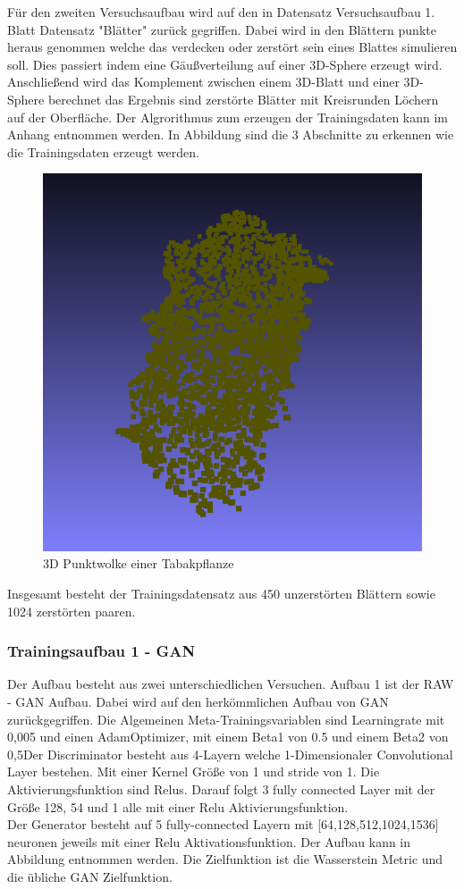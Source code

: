 \documentclass{llncs}
\begin{document}
Für den zweiten Versuchsaufbau wird auf den in Datensatz Versuchsaufbau 1. Blatt Datensatz "Blätter" zurück gegriffen. Dabei wird in den Blättern punkte heraus genommen welche das verdecken oder zerstört sein eines Blattes simulieren soll. Dies passiert indem eine Gäußverteilung auf einer 3D-Sphere erzeugt wird. Anschließend wird das Komplement zwischen einem 3D-Blatt und einer 3D-Sphere berechnet das Ergebnis sind zerstörte Blätter mit Kreisrunden Löchern auf der Oberfläche. Der Algrorithmus zum erzeugen der Trainingsdaten kann im Anhang entnommen werden. In Abbildung sind die 3 Abschnitte zu erkennen wie die Trainingsdaten erzeugt werden. 
\begin{figure}[htbp] 
	\centering
	\includegraphics[width=1.2\textwidth]{leaf1.png}
	\caption{3D Punktwolke einer Tabakpflanze}
	\label{fig:Bild2}
\end{figure}

Insgesamt besteht der Trainingsdatensatz aus 450 unzerstörten Blättern sowie 1024 zerstörten paaren. 
\subsubsection{Trainingsaufbau 1 - GAN}
Der Aufbau besteht aus zwei unterschiedlichen Versuchen. Aufbau 1 ist der RAW - GAN Aufbau. Dabei wird auf den herkömmlichen Aufbau von GAN zurückgegriffen. Die Algemeinen Meta-Trainingsvariablen sind Learningrate mit 0,005 und einen AdamOptimizer, mit einem Beta1 von 0.5 und einem Beta2 von 0,5Der Discriminator besteht aus 4-Layern welche 1-Dimensionaler Convolutional Layer bestehen. Mit einer Kernel Größe von 1 und stride von 1. Die Aktivierungsfunktion sind Relus. Darauf folgt 3 fully connected Layer mit der Größe 128, 54 und 1 alle mit einer Relu Aktivierungsfunktion.
\\
Der Generator besteht auf 5 fully-connected Layern mit [64,128,512,1024,1536] neuronen jeweils mit einer Relu Aktivationsfunktion. Der Aufbau kann in Abbildung entnommen werden. Die Zielfunktion ist die Wasserstein Metric und die übliche GAN Zielfunktion. 
\end{document}
